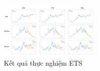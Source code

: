 \begin{figure}[H]
\centerline{\includegraphics[width=0.45\textwidth]{img/ETS_result.png}}
\caption{Kết quả thực nghiệm ETS}
\label{fig}
\end{figure}